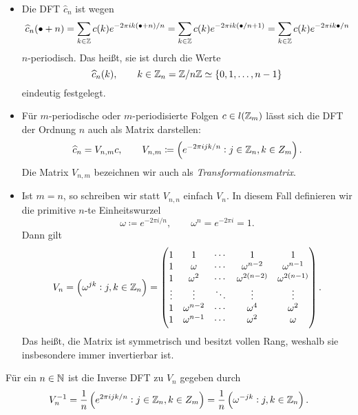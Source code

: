 \begin{remark}\leavevmode
\begin{itemize}
\item Die DFT $ \widehat{c}_{n} $ ist wegen
  \[
      \widehat{c}_{n}(\bullet + n)
    = \sum_{k \in \mathbb{Z}} c(k) e^{-2\pi ik(\bullet + n) / n}
    = \sum_{k \in \mathbb{Z}} c(k) e^{-2\pi ik(\bullet / n + 1)}
    = \sum_{k \in \mathbb{Z}} c(k) e^{-2\pi ik\bullet / n}
  \]
  $ n $-periodisch. Das heißt, sie ist durch die Werte
  \[
    \widehat{c}_{n}(k), \qquad k \in \mathbb{Z}_{n} = \mathbb{Z} / n\mathbb{Z} \simeq \{0, 1, \ldots, n - 1\}
  \]
  eindeutig festgelegt.
\item Für $ m $-periodische oder $ m $-periodisierte Folgen $ c \in l(\mathbb{Z}_{m}) $ lässt sich die DFT 
  der Ordnung $ n $ auch als Matrix darstellen:
  \[
    \widehat{c}_{n} = V_{n,m}c, \qquad
    V_{n,m} \coloneq \left( e^{-2\pi i j k / n} : j \in \mathbb{Z}_{n}, k \in Z_{m} \right).
  \]
  Die Matrix $ V_{n,m} $ bezeichnen wir auch als \emph{Transformationsmatrix}.
\item Ist $ m = n $, so schreiben wir statt $ V_{n,n} $ einfach $ V_{n} $. In diesem Fall definieren
  wir die primitive $ n $-te Einheitswurzel
  \[
    \omega \coloneq e^{-2\pi i / n}, \qquad \omega^{n} = e^{-2\pi i} = 1.
  \]
  Dann gilt
  \[
      V_{n} 
    = \left( \omega^{jk} : j,k \in \mathbb{Z}_{n} \right)
    = \begin{pmatrix}
        1 & 1 & \cdots & 1 & 1 \\
        1 & \omega & \cdots & \omega^{n - 2} & \omega^{n - 1} \\
        1 & \omega^{2} & \cdots & \omega^{2(n - 2)} & \omega^{2(n - 1)} \\
        \vdots & \vdots & \ddots & \vdots & \vdots \\
        1 & \omega^{n - 2} & \cdots & \omega^{4} & \omega^{2} \\
        1 & \omega^{n - 1} & \cdots & \omega^{2} & \omega
      \end{pmatrix}.
  \]
  Das heißt, die Matrix ist symmetrisch und besitzt vollen Rang, weshalb sie insbesondere immer 
  invertierbar ist.
\end{itemize}
\end{remark}

\begin{proposition}
Für ein $ n \in \mathbb{N} $ ist die Inverse DFT zu $ V_{n} $ gegeben durch
\[
    V_{n}^{-1}
  = \frac{1}{n} \left( e^{2\pi i j k / n} : j \in \mathbb{Z}_{n}, k \in Z_{m} \right)
  = \frac{1}{n} \left( \omega^{-jk} : j,k \in \mathbb{Z}_{n} \right).
\]
\end{proposition}

